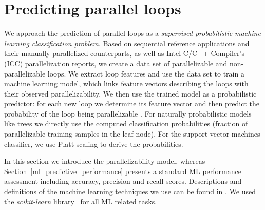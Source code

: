 \section{Predicting parallel loops}
\label{predicting_parallel_loops}
\quad We approach the prediction of parallel loops as a \emph{supervised probabilistic machine learning classification problem}. Based on sequential reference applications and their manually parallelized counterparts, as well as Intel C/C++ Compiler's (ICC) parallelization reports, we create a data set of parallelizable and non-parallelizable loops. We extract loop features and use the data set to train a machine learning model, which links feature vectors describing the loops with their observed parallelizability. We then use the trained model as a probabilistic predictor: for each new loop we determine its feature vector and then predict the probability of the loop being parallelizable \cite{Niculescu-Mizil:2005:PGP:1102351.1102430}. For naturally probabilistic models like trees we directly use the computed classification probabilities (fraction of parallelizable training samples in the leaf node). For the support vector machines classifier, we use Platt scaling to derive the probabilities.

In this section we introduce the parallelizability model, whereas Section~\ref{ml_predictive_performance} presents a standard ML performance assessment including accuracy, precision and recall scores. Descriptions and definitions of the machine learning techniques we use can be found in \cite{James:2013:ISL:2517747}. We used the \textit{scikit-learn} library~\cite{scikit-learn} for all ML related tasks.

